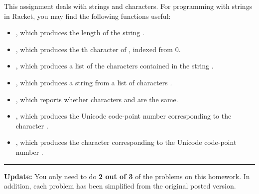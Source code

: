 \documentclass{article}
\begin{document}
\noindent
This assignment deals with strings and characters.  For programming with strings
in Racket, you may find the following functions useful:
\begin{itemize}\setlength\itemsep{0pt}

\item {}, which produces the length of the string
  .

\item {}, which produces the th character of
  , indexed from 0.

\item {}, which produces a list of the characters
  contained in the string .

\item {}, which produces a string from a list of
  characters .

\item {}, which reports whether characters  and
   are the same.

\item {}, which produces the Unicode code-point number
  corresponding to the character .

\item {}, which produces the character corresponding to
  the Unicode code-point number .

\end{itemize}

\noindent\rule{\linewidth}{1pt}

\medskip

\noindent\textbf{Update:} You only need to do \textbf{2 out of 3} of the
problems on this homework.  In addition, each problem has been simplified from
the original posted version.
\end{document}
